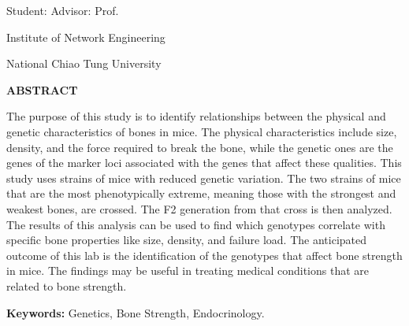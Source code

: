
\newcommand{\AbstractInstitute}{Institute of Network Engineering}

\newcommand{\AbstractContent}{
The purpose of this study is to identify relationships between the physical and genetic characteristics of bones in mice.  The physical characteristics include size, density, and the force required to break the bone, while the genetic ones are the genes of the marker loci associated with the genes that affect these qualities. This study uses strains of mice with reduced genetic variation.  The two strains of mice that are the most phenotypically extreme, meaning those with the strongest and weakest bones, are crossed.  The F2 generation from that cross is then analyzed. The results of this analysis can be used to find which genotypes correlate with specific bone properties like size, density, and failure load.  The anticipated outcome of this lab is the identification of the genotypes that affect bone strength in mice. The findings may be useful in treating medical conditions that are related to bone strength. 
}
\newcommand{\AbstractKeywords}{
Genetics, Bone Strength, Endocrinology.
}

\begin{center}
	\begin{minipage}{\textwidth}
    \centering
    {\large \textbf{\TitleEnglish}\par}
	\end{minipage}
\end{center}


\vspace{0.8cm}  
Student: \StudentNameEnglish
\hfill
Advisor: Prof. \AdvisorNameEnglish

\vspace{0.5cm}
\centerline{\AbstractInstitute}
\centerline{National Chiao Tung University} 
\vspace{0.5cm}
\centerline{\textbf{ABSTRACT}} 
\vspace{0.5cm}

\AbstractContent
 
\vspace{1cm} 
{\bf Keywords:} \AbstractKeywords 
